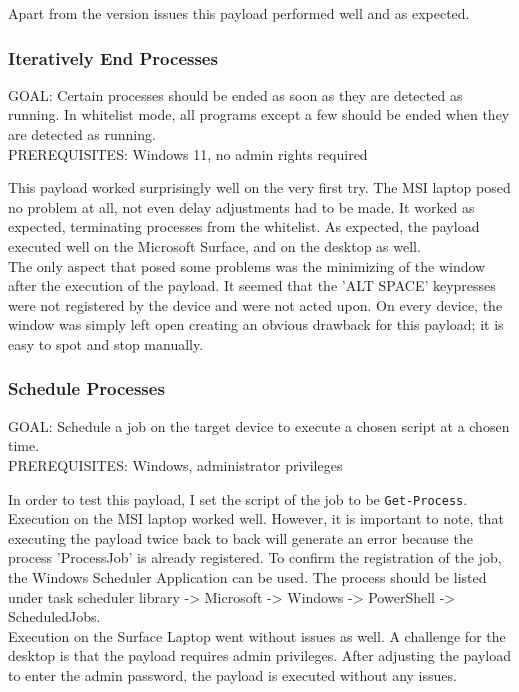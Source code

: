 Apart from the version issues this payload performed well and as expected. 


\subsubsection{Iteratively End Processes}



GOAL: Certain processes should be ended as soon as they are detected as running. In whitelist mode, all programs except a few should be ended when they are detected as running.\\
PREREQUISITES: Windows 11, no admin rights required


This payload worked surprisingly well on the very first try. The MSI laptop posed no problem at all, not even delay adjustments had to be made. It worked as expected, terminating processes from the whitelist. As expected, the payload executed well on the Microsoft Surface, and on the desktop as well. \\
The only aspect that posed some problems was the minimizing of the window after the execution of the payload. It seemed that the 'ALT SPACE' keypresses were not registered by the device and were not acted upon. On every device, the window was simply left open creating an obvious drawback for this payload; it is easy to spot and stop manually. 

\subsubsection{Schedule Processes}

GOAL: Schedule a job on the target device to execute a chosen script at a chosen time. \\
PREREQUISITES: Windows, administrator privileges

In order to test this payload, I set the script of the job to be \verb|Get-Process|. Execution on the MSI laptop worked well. However, it is important to note, that executing the payload twice back to back will generate an error because the process 'ProcessJob' is already registered. To confirm the registration of the job, the Windows Scheduler Application can be used. The process should be listed under task scheduler library -> Microsoft -> Windows -> PowerShell -> ScheduledJobs. \\
Execution on the Surface Laptop went without issues as well. A challenge for the desktop is that the payload requires admin privileges. After adjusting the payload to enter the admin password, the payload is executed without any issues. 

